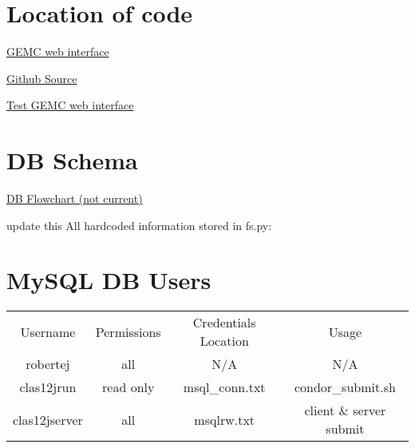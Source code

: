 


\section{Location of code}
\href{https://gemc.jlab.org/web_interface/index.php}{GEMC web interface}

\href{https://github.com/mit-mc-clas12}{Github Source}

\href{https://gemc.jlab.org/test/web_interface/index.php}{Test GEMC web interface}







\section{DB Schema}
\href{https://dbdiagram.io/d/5c9b829bf7c5bb70c72f6c34}{DB Flowchart (not current)}

update this
All hardcoded information stored in fs.py:

\section{MySQL DB Users}
\begin{center}
\begin{tabular}{ c c c c }
Username & Permissions & Credentials Location & Usage\\
robertej & all & N/A & N/A\\
clas12jrun & read only & msql\_conn.txt & condor\_submit.sh\\
clas12jserver & all & msqlrw.txt & client \& server submit\\
\end{tabular}
\end{center}